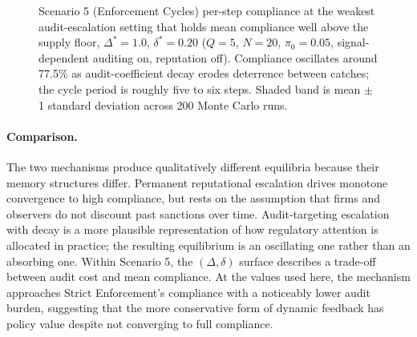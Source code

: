 \begin{figure}[htbp]
\centering
{}
\caption{Scenario 5 (Enforcement Cycles) per-step compliance at the
  weakest audit-escalation setting that holds mean compliance well
  above the supply floor, $\Delta^* = 1.0$, $\delta^* = 0.20$
  ($Q=5$, $N=20$, $\pi_0 = 0.05$, signal-dependent auditing on,
  reputation off). Compliance oscillates around 77.5\% as
  audit-coefficient decay erodes deterrence between catches; the
  cycle period is roughly five to six steps. Shaded band is mean
  $\pm$ 1 standard deviation across 200 Monte Carlo runs.}
\label{fig:oscillation}
\end{figure}

\paragraph{Comparison.}

The two mechanisms produce qualitatively different equilibria because
their memory structures differ. Permanent reputational escalation
drives monotone convergence to high compliance, but rests on the
assumption that firms and observers do not discount past sanctions
over time. Audit-targeting escalation with decay is a more plausible
representation of how regulatory attention is allocated in practice;
the resulting equilibrium is an oscillating one rather than an
absorbing one. Within Scenario 5, the $(\Delta, \delta)$ surface
describes a trade-off between audit cost and mean compliance. At the
values used here, the mechanism approaches Strict Enforcement's
compliance with a noticeably lower audit burden, suggesting that the
more conservative form of dynamic feedback has policy value despite
not converging to full compliance.